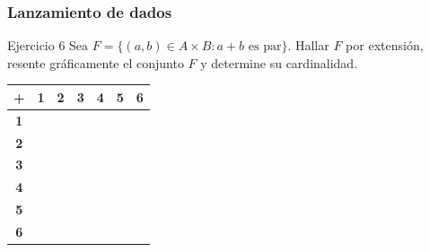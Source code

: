 \documentclass[aspectratio=169]{beamer}
\begin{document}
\begin{frame}[t]
	\frametitle{Lanzamiento de dados}
	\begin{block}{Ejercicio 6}
		Sea $F=\{(a, b)\in A\times B: a+b\text{ es par}\}$. Hallar $F$ por extensión, resente gráficamente el conjunto $F $ y determine su cardinalidad.
	\end{block}


	\renewcommand{\arraystretch}{1.3} %
	\begin{flushleft}
		\begin{tabular}{|c|*{6}{c|}}
			\hline
			\cellcolor{gray!30} \textbf{+}
			                                & \cellcolor{yellow} \textbf{1}
			                                & \cellcolor{yellow} \textbf{2}
			                                & \cellcolor{yellow} \textbf{3}
			                                & \cellcolor{yellow} \textbf{4}
			                                & \cellcolor{yellow} \textbf{5}
			                                & \cellcolor{yellow} \textbf{6}               \\
			\hline
			\cellcolor{green!70} \textbf{1} &                               &  &  &  &  & \\ \hline
			\cellcolor{green!70} \textbf{2} &                               &  &  &  &  & \\ \hline
			\cellcolor{green!70} \textbf{3} &                               &  &  &  &  & \\ \hline
			\cellcolor{green!70} \textbf{4} &                               &  &  &  &  & \\ \hline
			\cellcolor{green!70} \textbf{5} &                               &  &  &  &  & \\ \hline
			\cellcolor{green!70} \textbf{6} &                               &  &  &  &  & \\
			\hline
		\end{tabular}
	\end{flushleft}
\end{frame}
\end{document}
